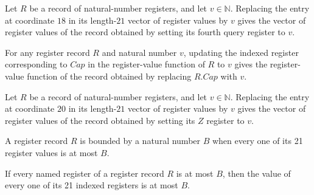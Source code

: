 \begin{lemma}
\label{Complexity.Codec.Regs.upd_Q4}
\leanok
{}
Let $R$ be a record of natural-number registers, and let $v\in\mathbb N$. Replacing the
entry at coordinate $18$ in its length-$21$ vector of register values by $v$ gives the
vector of register values of the record obtained by setting its fourth query register to
$v$.
\end{lemma}

\begin{lemma}
\label{Complexity.Codec.Regs.upd_Cap}
\leanok
{}
For any register record $R$ and natural number $v$, updating the indexed register
corresponding to $Cap$ in the register-value function of $R$ to $v$ gives the
register-value function of the record obtained by replacing $R.Cap$ with $v$.
\end{lemma}

\begin{lemma}
\label{Complexity.Codec.Regs.upd_Z}
\leanok
{}
Let $R$ be a record of natural-number registers, and let $v\in\mathbb N$. Replacing the
entry at coordinate $20$ in its length-$21$ vector of register values by $v$ gives the
vector of register values of the record obtained by setting its $Z$ register to $v$.
\end{lemma}

\begin{definition}
\label{Complexity.Codec.Regs.Bd}
\leanok
{}
A register record $R$ is bounded by a natural number $B$ when every one of its 21
register values is at most $B$.
\end{definition}

\begin{lemma}
\label{Complexity.Codec.Regs.Bd.val_le}
\leanok
{}
If every named register of a register record $R$ is at most $B$, then the value of every
one of its 21 indexed registers is at most $B$.
\end{lemma}

